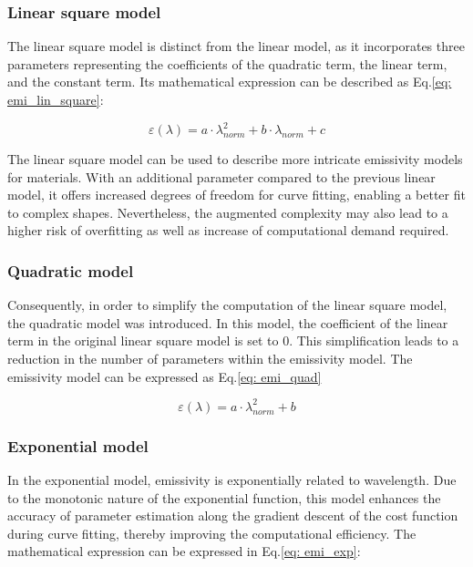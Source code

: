 \subsubsection{Linear square model}
The linear square model is distinct from the linear model, 
as it incorporates three parameters representing the coefficients 
of the quadratic term, the linear term, and the constant term. Its 
mathematical expression can be described as Eq.\ref{eq: emi_lin_square}:

\begin{equation}
  \label{eq: emi_lin_square}
  \varepsilon(\lambda) = a \cdot \lambda_{norm}^2 + b \cdot \lambda_{norm} + c
\end{equation}

The linear square model can be used to describe more intricate emissivity 
models for materials. With an additional parameter compared to the 
previous linear model, it offers increased degrees of freedom for 
curve fitting, enabling a better fit to complex shapes. Nevertheless, 
the augmented complexity may also lead to a higher risk of overfitting as 
well as increase of computational demand required.

\subsubsection{Quadratic model}
Consequently, in order to simplify the computation of the linear 
square model, the quadratic model was introduced. In this model, 
the coefficient of the linear term in the original linear square 
model is set to 0. This simplification leads to a reduction in 
the number of parameters within the emissivity model. The emissivity model 
can be expressed as Eq.\ref{eq: emi_quad}

\begin{equation}
  \label{eq: emi_quad}
  \varepsilon(\lambda) = a \cdot \lambda_{norm}^2 + b
\end{equation}

\subsubsection{Exponential model}
In the exponential model, emissivity is exponentially related to wavelength. Due to 
the monotonic nature of the exponential function, this model enhances the accuracy of 
parameter estimation along the gradient descent of the cost function during curve fitting, 
thereby improving the computational efficiency. The mathematical expression can be 
expressed in Eq.\ref{eq: emi_exp}:

